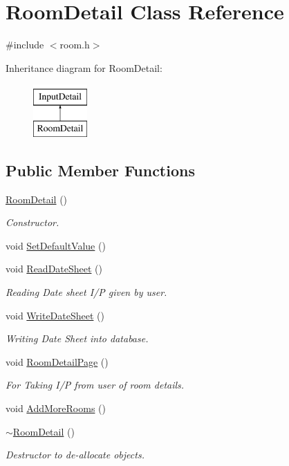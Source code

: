 \hypertarget{classRoomDetail}{\section{Room\-Detail Class Reference}
\label{classRoomDetail}
}


{\ttfamily \#include $<$room.\-h$>$}

Inheritance diagram for Room\-Detail\-:\begin{figure}[H]
\begin{center}
\leavevmode
\includegraphics[height=2.000000cm]{classRoomDetail}
\end{center}
\end{figure}
\subsection*{Public Member Functions}
\begin{DoxyCompactItemize}
\item 
\hyperlink{classRoomDetail_acbbb21580bc1591daf23e614011acc06}{Room\-Detail} ()
\begin{DoxyCompactList}\small\item\em Constructor. \end{DoxyCompactList}\item 
void \hyperlink{classRoomDetail_a117bed37b0f95b364b7133fe13afa9b7}{Set\-Default\-Value} ()
\item 
void \hyperlink{classRoomDetail_ab8a07fd05ab314e85b374191e38e8556}{Read\-Date\-Sheet} ()
\begin{DoxyCompactList}\small\item\em Reading Date sheet I/\-P given by user. \end{DoxyCompactList}\item 
void \hyperlink{classRoomDetail_a90d4fc5bf3497068efecb5c9ec13e887}{Write\-Date\-Sheet} ()
\begin{DoxyCompactList}\small\item\em Writing Date Sheet into database. \end{DoxyCompactList}\item 
void \hyperlink{classRoomDetail_a22f437f08d38ac6b878450e7d0e43dff}{Room\-Detail\-Page} ()
\begin{DoxyCompactList}\small\item\em For Taking I/\-P from user of room details. \end{DoxyCompactList}\item 
void \hyperlink{classRoomDetail_ac4d4701717acda86a95c68ef5abbab28}{Add\-More\-Rooms} ()
\item 
\hyperlink{classRoomDetail_ae65b9b167e75a7dc994c4e2021937c68}{$\sim$\-Room\-Detail} ()
\begin{DoxyCompactList}\small\item\em Destructor to de-\/allocate objects. \end{DoxyCompactList}\end{DoxyCompactItemize}
